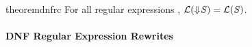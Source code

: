 \documentclass[acmsmall]{acmart}
\begin{document}
\begin{restatable}{theorem}{dnfrc}
  \label{thm:completeness-dnf-lenses}
  For all regular expressions \Regex{},
  $\mathcal{L}(\Downarrow\mkern-4mu \mathit{S})=\mathcal{L}(\mathit{S}{})$.
\end{restatable}





\paragraph*{DNF Regular Expression Rewrites}
\end{document}
